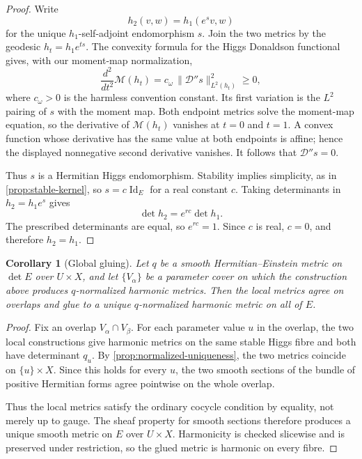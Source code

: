 \documentclass[11pt,reqno]{amsart}
\newtheorem{corollary}[theorem]{Corollary}
\theoremstyle{definition}
\theoremstyle{remark}
\newcommand{\cD}{\mathcal D}
\newcommand{\Id}{\operatorname{Id}}
\begin{document}
\begin{proof}
Write
\[
 h_2(v,w)=h_1(e^s v,w)
\]
for the unique $h_1$-self-adjoint endomorphism $s$.  Join the two
metrics by the geodesic $h_t=h_1e^{ts}$.  The convexity formula for the
Higgs Donaldson functional gives, with our moment-map normalization,
\[
 \frac{d^2}{dt^2}\mathcal M(h_t)
 =c_\omega\,\|\cD''s\|^2_{L^2(h_t)}\ge0,
\]
where $c_\omega>0$ is the harmless convention constant.  Its first
variation is the $L^2$ pairing of $s$ with the moment map.  Both endpoint
metrics solve the moment-map equation, so the derivative of
$\mathcal M(h_t)$ vanishes at $t=0$ and $t=1$.  A convex function whose
derivative has the same value at both endpoints is affine; hence the
displayed nonnegative second derivative vanishes.  It follows that
$\cD''s=0$.

Thus $s$ is a Hermitian Higgs endomorphism.  Stability implies
simplicity, as in \cref{prop:stable-kernel}, so $s=c\Id_E$ for a real
constant $c$.  Taking determinants in $h_2=h_1e^s$ gives
\[
  \det h_2=e^{rc}\det h_1.
\]
The prescribed determinants are equal, so $e^{rc}=1$.  Since $c$ is
real, $c=0$, and therefore $h_2=h_1$.
\end{proof}

\begin{corollary}[Global gluing]\label{cor:metrics-glue}
Let $q$ be a smooth Hermitian--Einstein metric on $\det E$ over $U\times X$, and let $\{V_\alpha\}$ be a parameter cover on which the construction above produces $q$-normalized harmonic metrics.  Then the local metrics agree on overlaps and glue to a unique $q$-normalized harmonic metric on all of $E$.
\end{corollary}

\begin{proof}
Fix an overlap $V_\alpha\cap V_\beta$.  For each parameter value $u$ in the overlap, the two local constructions give harmonic metrics on the same stable Higgs fibre and both have determinant $q_u$.  By \cref{prop:normalized-uniqueness}, the two metrics coincide on $\{u\}\times X$.  Since this holds for every $u$, the two smooth sections of the bundle of positive Hermitian forms agree pointwise on the whole overlap.

Thus the local metrics satisfy the ordinary cocycle condition by equality, not merely up to gauge.  The sheaf property for smooth sections therefore produces a unique smooth metric on $E$ over $U\times X$.  Harmonicity is checked slicewise and is preserved under restriction, so the glued metric is harmonic on every fibre.
\end{proof}
\end{document}

